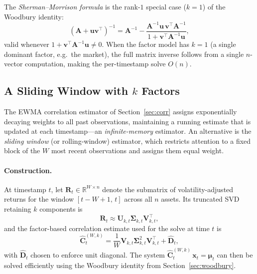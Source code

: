 \documentclass[11pt,a4paper]{article}
\newcommand{\C}{\mathbf{C}}
\newcommand{\x}{\mathbf{x}}
\newcommand{\muvec}{\bm{\mu}}
\newcommand{\R}{\mathbb{R}}
\newcommand{\Dspe}{\mathbf{D}}
\begin{document}
The \emph{Sherman--Morrison formula} is the rank-$1$ special case ($k = 1$)
of the Woodbury identity:
\begin{equation}
  \label{eq:sherman_morrison}
  (\mathbf{A} + \mathbf{u}\mathbf{v}^\top)^{-1}
  = \mathbf{A}^{-1}
    - \frac{\mathbf{A}^{-1}\mathbf{u}\,\mathbf{v}^\top\mathbf{A}^{-1}}
           {1 + \mathbf{v}^\top\mathbf{A}^{-1}\mathbf{u}},
\end{equation}
valid whenever $1 + \mathbf{v}^\top\mathbf{A}^{-1}\mathbf{u} \neq 0$.  When
the factor model has $k = 1$ (a single dominant factor, e.g.\ the market), the
full matrix inverse follows from a single $n$-vector computation, making
the per-timestamp solve $O(n)$.

\subsection{A Sliding Window with $k$ Factors}
\label{sec:sliding_window}

The EWMA correlation estimator of Section~\ref{sec:corr} assigns
exponentially decaying weights to all past observations, maintaining a running
estimate that is updated at each timestamp---an \emph{infinite-memory}
estimator.  An alternative is the \emph{sliding window} (or rolling-window)
estimator, which restricts attention to a fixed block of the $W$ most recent
observations and assigns them equal weight.

\paragraph{Construction.}
At timestamp $t$, let $\mathbf{R}_t \in \R^{W \times n}$ denote the submatrix
of volatility-adjusted returns for the window $[t - W + 1,\, t]$ across all
$n$ assets.  Its truncated SVD retaining $k$ components is
\begin{equation}
  \label{eq:sliding_svd}
  \mathbf{R}_t \approx \mathbf{U}_{k,t}\bm{\Sigma}_{k,t}\mathbf{V}_{k,t}^\top,
\end{equation}
and the factor-based correlation estimate used for the solve at time $t$ is
\begin{equation}
  \label{eq:sliding_corr}
  \hat{\C}_t^{(W,k)}
  = \frac{1}{W}\mathbf{V}_{k,t}\bm{\Sigma}_{k,t}^2\mathbf{V}_{k,t}^\top
  + \hat{\Dspe}_t,
\end{equation}
with $\hat{\Dspe}_t$ chosen to enforce unit diagonal.  The system
$\hat{\C}_t^{(W,k)}\,\x_t = \muvec_t$ can then be solved efficiently using
the Woodbury identity from Section~\ref{sec:woodbury}.
\end{document}
